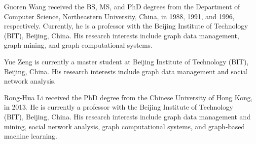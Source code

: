 \documentclass[10pt,journal,compsoc]{IEEEtran}
\begin{document}
\begin{IEEEbiography}{Guoren Wang}
	received the BS, MS, and PhD degrees from the Department of Computer Science, Northeastern University, China, in 1988, 1991, and
1996, respectively. Currently, he is a professor with the Beijing Institute of Technology (BIT), Beijing, China. His research interests include graph data management, graph mining, and graph computational systems.
\end{IEEEbiography}
\vspace{-10ex}
\begin{IEEEbiography}{Yue Zeng}
	is currently a master student at Beijing Institute of Technology (BIT), Beijing, China. His research interests include graph data management and social network analysis.
\end{IEEEbiography}
\vspace{-10ex}
\begin{IEEEbiography}{Rong-Hua Li}
	received the PhD degree from the Chinese University of Hong Kong, in 2013. He is currently a professor with the Beijing Institute of Technology (BIT), Beijing, China. His research interests include graph data management and mining, social network analysis, graph computational systems, and graph-based machine learning.
\end{IEEEbiography}
\end{document}
